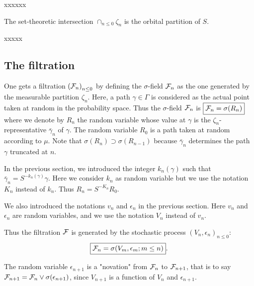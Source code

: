 \documentclass[12pt,a4paper]{article}
\begin{document}
\bigskip 

xxxxxx

\begin{lemma}
The set-theoretic intersection $\cap_{n \leq 0} \zeta_n$ is the orbital partition of $S$. 
\end{lemma}


%

xxxxx

\subsection{The filtration}

One gets a filtration ${(\mathcal{F}_n)}_{n \leq 0}$ by defining the $\sigma$-field 
$\mathcal{F}_n$ as the one generated by the measurable partition $\zeta_n$. 
Here, a path $\gamma \in \Gamma$ is considered as the actual point taken at random 
in the probability space. 
Thus the $\sigma$-field $\mathcal{F}_n$ is 
$\boxed{\mathcal{F}_n = \sigma(R_n)}$ where we denote by $R_n$ the random variable whose 
value at $\gamma$ is the $\zeta_n$-representative 
$\bar\gamma_n$ of $\gamma$. 
The random variable  $R_0$ is a path taken at random according to $\mu$. 
Note that $\sigma(R_{n}) \supset \sigma(R_{n-1})$ because 
$\bar\gamma_n$ determines the path 
$\gamma$ truncated at $n$. 

In the previous section, we introduced the integer $k_n(\gamma)$ such that 
$\bar\gamma_n = S^{-k_n(\gamma)}\gamma$. 
Here we consider $k_n$ as random variable but 
we use the notation $K_n$ instead of $k_n$. 
Thus $\boxed{R_n = S^{-K_n} R_0}$. 


We also introduced the notations $v_n$ and $\epsilon_n$ in the previous section. 
Here $v_n$ and $\epsilon_n$ are random variables, 
and we use the notation $V_n$ instead of $v_n$. 

Thus the filtration $\mathcal{F}$ is  generated by the stochastic process 
${(V_n, \epsilon_n)}_{n \leq 0}$:
$$
\boxed{\mathcal{F}_n = \sigma(V_m, \epsilon_m; m \leq n)}.
$$

The random variable $\epsilon_{n+1}$ is a "novation" from $\mathcal{F}_n$ to $\mathcal{F}_{n+1}$, that is 
to say $\mathcal{F}_{n+1} = \mathcal{F}_n \vee \sigma(\epsilon_{n+1})$, since 
$V_{n+1}$ is a function of $V_n$ and $\epsilon_{n+1}$. 
\end{document}

